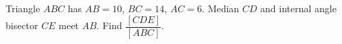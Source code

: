 Triangle $ABC$ has $AB=10$, $BC=14$, $AC=6$. Median $CD$ and internal angle bisector $CE$ meet $AB$. Find $\dfrac{[CDE]}{[ABC]}$.
